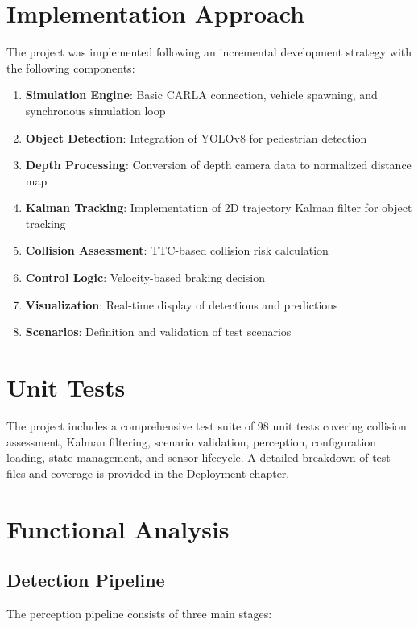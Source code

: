 \section{Implementation Approach}

The project was implemented following an incremental development strategy with the following components:
\begin{enumerate}
    \item \textbf{Simulation Engine}: Basic CARLA connection, vehicle spawning, and synchronous simulation loop
    \item \textbf{Object Detection}: Integration of YOLOv8 for pedestrian detection
    \item \textbf{Depth Processing}: Conversion of depth camera data to normalized distance map
    \item \textbf{Kalman Tracking}: Implementation of 2D trajectory Kalman filter for object tracking
    \item \textbf{Collision Assessment}: TTC-based collision risk calculation
    \item \textbf{Control Logic}: Velocity-based braking decision
    \item \textbf{Visualization}: Real-time display of detections and predictions
    \item \textbf{Scenarios}: Definition and validation of test scenarios
\end{enumerate}

\section{Unit Tests}

The project includes a comprehensive test suite of 98 unit tests covering collision assessment, Kalman filtering, scenario validation, perception, configuration loading, state management, and sensor lifecycle. A detailed breakdown of test files and coverage is provided in the Deployment chapter.

\section{Functional Analysis}

\subsection{Detection Pipeline}

The perception pipeline consists of three main stages:

